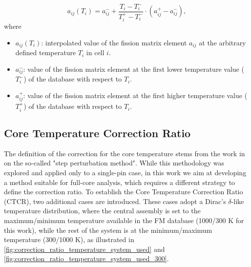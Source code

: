\documentclass[letterpaper]{physor2026}
\begin{document}
\begin{equation}\label{eq:linear_interpolation}
     a_{ij}(T_i)= a_{ij}^{-} + \frac{T_i-T_i^{-}}{T_i^{+}-T_i^{-}} \cdot (a_{ij}^{+}-a_{ij}^{-}),
\end{equation}
where
\begin{itemize}
    \item $a_{ij}(T_i)$: interpolated value of the fission matrix element $a_{ij}$ at the arbitrary defined temperature $T_i$ in cell $i$.
    \item $a_{ij}^{-}$: value of the fission matrix element at the first lower temperature value ($T_i^-$) of the database with respect to $T_i$.
    \item $a_{ij}^{+}$: value of the fission matrix element at the first higher temperature value ($T_i^+$) of the database with respect to $T_i$.
\end{itemize}

\subsection{Core Temperature Correction Ratio}
The definition of the correction for the core temperature stems from the work in \cite{Rau2020} on the so-called "step perturbation method". While this methodology was explored and applied only to a single-pin case, in this work we aim at developing a method suitable for full-core analysis, which requires a different strategy to define the correction ratio.
To establish the Core Temperature Correction Ratio (CTCR), two additional cases are introduced. These cases adopt a Dirac's $\delta$-like temperature distribution, where the central assembly is set to the maximum/minimum temperature available in the FM database (1000/300 K for this work), while the rest of the system is at the minimum/maximum temperature (300/1000 K), as illustrated in \cref{fig:correction_ratio_temperature_system_used} and \cref{fig:correction_ratio_temperature_system_used_300}.

\end{document}
